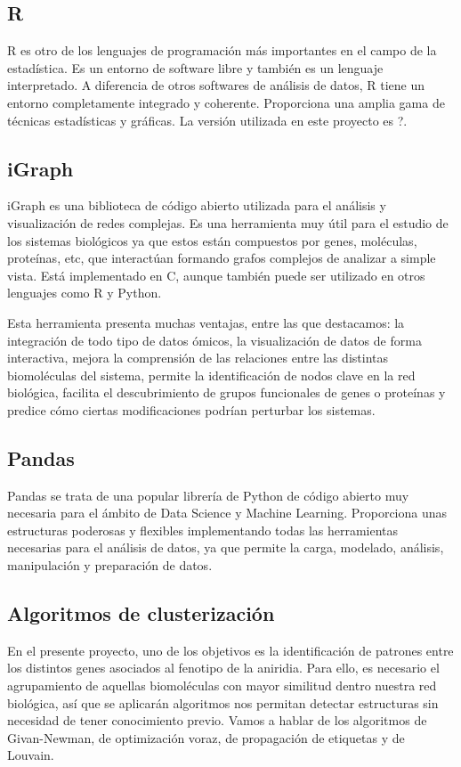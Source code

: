 \subsection{R}
R es otro de los lenguajes de programación más importantes en el campo de la estadística. Es un entorno de software libre y también es un lenguaje interpretado. A diferencia de otros softwares de análisis de datos, R tiene un entorno completamente integrado y coherente. Proporciona una amplia gama de técnicas estadísticas y gráficas. La versión utilizada en este proyecto es ?.

\subsection{iGraph}
iGraph es una biblioteca de código abierto utilizada para el análisis y visualización de redes complejas. Es una herramienta muy útil para el estudio de los sistemas biológicos ya que estos están compuestos por genes, moléculas, proteínas, etc, que interactúan formando grafos complejos de analizar a simple vista. Está implementado en C, aunque también puede ser utilizado en otros lenguajes como R y Python. 

Esta herramienta presenta muchas ventajas, entre las que destacamos: la integración de todo tipo de datos ómicos, la visualización de datos de forma interactiva, mejora la comprensión de las relaciones entre las distintas biomoléculas del sistema, permite la identificación de nodos clave en la red biológica, facilita el descubrimiento de grupos funcionales de genes o proteínas y predice cómo ciertas modificaciones podrían perturbar los sistemas.

\subsection{Pandas}
Pandas se trata de una popular librería de Python de código abierto muy necesaria para el ámbito de Data Science y Machine Learning. Proporciona unas estructuras poderosas y flexibles implementando todas las herramientas necesarias para el análisis de datos, ya que permite la carga, modelado, análisis, manipulación y preparación de datos.

\subsection{Algoritmos de clusterización}
En el presente proyecto, uno de los objetivos es la identificación de patrones entre los distintos genes asociados al fenotipo de la aniridia. Para ello, es necesario el agrupamiento de aquellas biomoléculas con mayor similitud dentro nuestra red biológica, así que se aplicarán algoritmos nos permitan detectar estructuras sin necesidad de tener conocimiento previo. Vamos a hablar de los algoritmos de Givan-Newman, de optimización voraz, de propagación de etiquetas y de Louvain.

